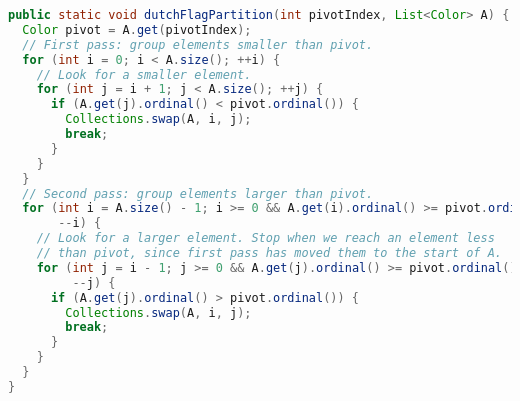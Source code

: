 \documentclass[10pt,openany,twoside,letterpaper,extrafontsizes]{memoir}
\newif\ifPython
\begin{document}
\begin{Spacing}{\arraysSpacing}
\begin{lstlisting}[language=Java]
public static void dutchFlagPartition(int pivotIndex, List<Color> A) {
  Color pivot = A.get(pivotIndex);
  // First pass: group elements smaller than pivot.
  for (int i = 0; i < A.size(); ++i) {
    // Look for a smaller element.
    for (int j = i + 1; j < A.size(); ++j) {
      if (A.get(j).ordinal() < pivot.ordinal()) {
        Collections.swap(A, i, j);
        break;
      }
    }
  }
  // Second pass: group elements larger than pivot.
  for (int i = A.size() - 1; i >= 0 && A.get(i).ordinal() >= pivot.ordinal();
       --i) {
    // Look for a larger element. Stop when we reach an element less
    // than pivot, since first pass has moved them to the start of A.
    for (int j = i - 1; j >= 0 && A.get(j).ordinal() >= pivot.ordinal();
         --j) {
      if (A.get(j).ordinal() > pivot.ordinal()) {
        Collections.swap(A, i, j);
        break;
      }
    }
  }
}
\end{lstlisting}
\fi%
\ifPython
\begin{lstlisting}[language=Python]
RED, WHITE, BLUE = range(3)


def dutch_flag_partition(pivot_index, A):
    pivot = A[pivot_index]
    # First pass: group elements smaller than pivot.
    for i in range(len(A)):
        # Look for a smaller element.
        for j in range(i + 1, len(A)):
            if A[j] < pivot:
                A[i], A[j] = A[j], A[i]
                break
    # Second pass: group elements larger than pivot.
    for i in reversed(range(len(A))):
        if A[i] < pivot:
            break
        # Look for a larger element. Stop when we reach an element less than
        # pivot, since first pass has moved them to the start of A.
        for j in reversed(range(i)):
            if A[j] > pivot:
                A[i], A[j] = A[j], A[i]
                break
\end{lstlisting}
\fi%


\end{Spacing}
\end{document}
